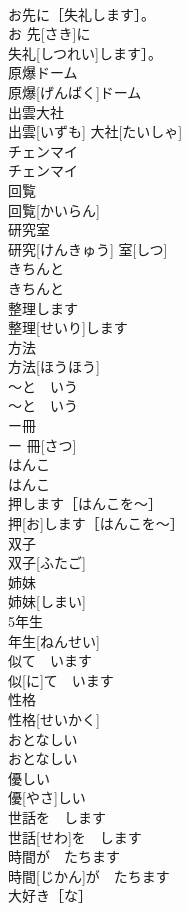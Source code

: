 \documentclass[8pt]{extreport}
\begin{document}
\begin{CJK}{UTF8}{min}
\\	お先に［失礼します］。	
\\	お 先[さき]に
\\	失礼[しつれい]します］。	
\\	原爆ドーム	
\\	原爆[げんばく]ドーム	
\\	出雲大社	
\\	出雲[いずも] 大社[たいしゃ]	
\\	チェンマイ	
\\	チェンマイ	
\\	回覧	
\\	回覧[かいらん]	
\\	研究室	
\\	研究[けんきゅう] 室[しつ]	
\\	きちんと	
\\	きちんと	
\\	整理します	
\\	整理[せいり]します	
\\	方法	
\\	方法[ほうほう]	
\\	〜と　いう	
\\	〜と　いう	
\\	ー冊	
\\	ー 冊[さつ]	
\\	はんこ	
\\	はんこ	
\\	押します［はんこを〜］	
\\	押[お]します［はんこを〜］	
\\	双子	
\\	双子[ふたご]	
\\	姉妹	
\\	姉妹[しまい]	
\\	5年生	
\\	年生[ねんせい]	
\\	似て　います	
\\	似[に]て　います	
\\	性格	
\\	性格[せいかく]	
\\	おとなしい	
\\	おとなしい	
\\	優しい	
\\	優[やさ]しい	
\\	世話を　します	
\\	世話[せわ]を　します	
\\	時間が　たちます	
\\	時間[じかん]が　たちます	
\\	大好き［な］	

\end{CJK}
\end{document}
